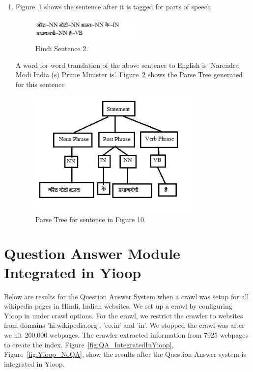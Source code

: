 \begin{enumerate}
\break
\item  Figure~\ref{fig:sentence_testcase2} shows the sentence after it is tagged for parts of speech

\begin{figure}[htb]
\centering
\includegraphics[width=0.5\textwidth]{images/sentence_testcase2.jpg}
\caption{Hindi Sentence 2.} 
\label{fig:sentence_testcase2}
\end{figure}

A word for word translation of the above sentence to English is 'Narendra Modi India (s) Prime Minister is'. Figure~\ref{fig:standalone_testcase2} shows the Parse Tree generated for this sentence 

\begin{figure}[htb]
\centering
\includegraphics[width=0.8\textwidth]{images/standalone_testcase2.jpg}
\caption{Parse Tree for sentence in Figure 10.} 
\label{fig:standalone_testcase2}
\end{figure}

\end{enumerate}

\break
\section{Question Answer Module Integrated in Yioop}
\paragraph{}
Below are results for the Question Answer System when a crawl was setup for all wikipedia pages in Hindi, Indian websites. We set up a crawl by configuring Yioop in under crawl options. For the crawl, we restrict the crawler to websites from domains 'hi.wikipedia.org', 'co.in' and 'in'. We stopped the crawl was after we hit 200,000 webpages. The crawler extracted information from 7925 webpages to create the index. Figure~\ref{fig:QA_IntegratedInYioop},  Figure~\ref{fig:Yioop_NoQA}, show the results after the Question Answer system is integrated in Yioop. 

